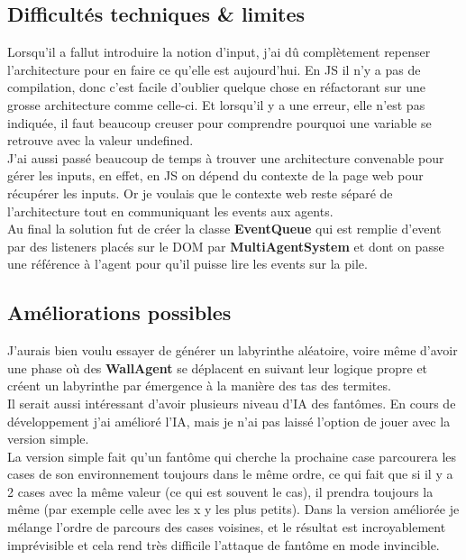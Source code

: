 \documentclass[11pt,a4paper,oneside]{report}
\begin{document}
\subsection*{Difficultés techniques \& limites}
Lorsqu'il a fallut introduire la notion d'input, j'ai dû complètement repenser l'architecture pour en faire ce qu'elle est aujourd'hui. En JS il n'y a pas de compilation, donc c'est facile d'oublier quelque chose en réfactorant sur une grosse architecture comme celle-ci. Et lorsqu'il y a une erreur, elle n'est pas indiquée, il faut beaucoup creuser pour comprendre pourquoi une variable se retrouve avec la valeur undefined.\\
J'ai aussi passé beaucoup de temps à trouver une architecture convenable pour gérer les inputs, en effet, en JS on dépend du contexte de la page web pour récupérer les inputs. Or je voulais que le contexte web reste séparé de l'architecture tout en communiquant les events aux agents.\\
Au final la solution fut de créer la classe \textbf{EventQueue} qui est remplie d'event par des listeners placés sur le DOM par \textbf{MultiAgentSystem} et dont on passe une référence à l'agent pour qu'il puisse lire les events sur la pile.\\

\subsection*{Améliorations possibles}
J'aurais bien voulu essayer de générer un labyrinthe aléatoire, voire même d'avoir une phase où des \textbf{WallAgent} se déplacent en suivant leur logique propre et créent un labyrinthe par émergence à la manière des tas des termites.\\
Il serait aussi intéressant d'avoir plusieurs niveau d'IA des fantômes. En cours de développement j'ai amélioré l'IA, mais je n'ai pas laissé l'option de jouer avec la version simple.\\
La version simple fait qu'un fantôme qui cherche la prochaine case parcourera les cases de son environnement toujours dans le même ordre, ce qui fait que si il y a 2 cases avec la même valeur (ce qui est souvent le cas), il prendra toujours la même (par exemple celle avec les x y les plus petits). Dans la version améliorée je mélange l'ordre de parcours des cases voisines, et le résultat est incroyablement imprévisible et cela rend très difficile l'attaque de fantôme en mode invincible.
\end{document}
